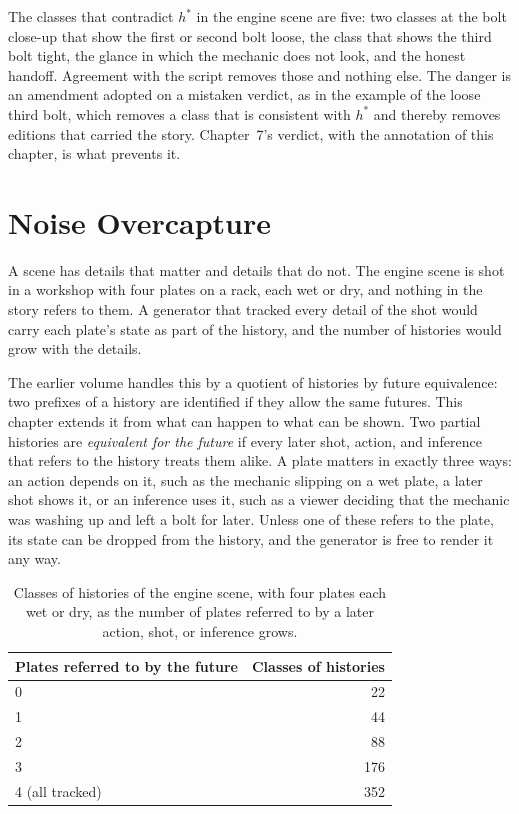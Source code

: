 \documentclass[11pt,twoside,openright]{book}
\theoremstyle{plain}
\theoremstyle{definition}
\theoremstyle{remark}
\begin{document}
The classes that contradict $h^\ast$ in the engine scene are five: two classes at the bolt close-up that show the first or second bolt loose, the class that shows the third bolt tight, the glance in which the mechanic does not look, and the honest handoff. Agreement with the script removes those and nothing else. The danger is an amendment adopted on a mistaken verdict, as in the example of the loose third bolt, which removes a class that is consistent with $h^\ast$ and thereby removes editions that carried the story. Chapter~7's verdict, with the annotation of this chapter, is what prevents it.

\section{Noise Overcapture}\label{sec:noise}

A scene has details that matter and details that do not. The engine scene is shot in a workshop with four plates on a rack, each wet or dry, and nothing in the story refers to them. A generator that tracked every detail of the shot would carry each plate's state as part of the history, and the number of histories would grow with the details.

The earlier volume handles this by a quotient of histories by future equivalence: two prefixes of a history are identified if they allow the same futures. This chapter extends it from what can happen to what can be shown. Two partial histories are \emph{equivalent for the future} if every later shot, action, and inference that refers to the history treats them alike. A plate matters in exactly three ways: an action depends on it, such as the mechanic slipping on a wet plate, a later shot shows it, or an inference uses it, such as a viewer deciding that the mechanic was washing up and left a bolt for later. Unless one of these refers to the plate, its state can be dropped from the history, and the generator is free to render it any way.

\begin{table}[ht]
\centering
\begin{tabular}{@{}lr@{}}
\toprule
Plates referred to by the future & Classes of histories\\
\midrule
0 & 22\\
1 & 44\\
2 & 88\\
3 & 176\\
4 (all tracked) & 352\\
\bottomrule
\end{tabular}
\caption{Classes of histories of the engine scene, with four plates each wet or dry, as the number of plates referred to by a later action, shot, or inference grows.}\label{tab:noise}
\end{table}
\end{document}
